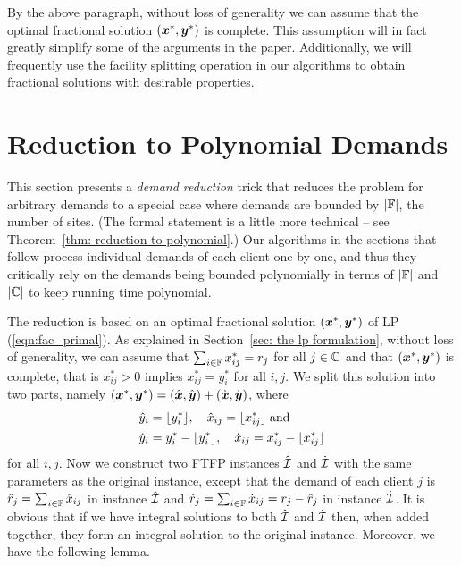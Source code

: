\documentclass[11pt]{article}
\begin{document}
By the above paragraph,  without loss of generality we can
assume that the optimal fractional solution $(\boldsymbol{x}^\ast, \boldsymbol{y}^\ast)$
is complete. This assumption will in fact greatly simplify some of
the arguments in the paper. Additionally, we will frequently use the facility
splitting operation in our algorithms to obtain fractional solutions with
desirable properties.



\section{Reduction to Polynomial Demands}
\label{sec: polynomial demands}

This section presents a \emph{demand reduction} trick that
reduces the problem for arbitrary demands to a special case
where demands are bounded by $|\mathbb{F}|$, the number of
sites.  (The formal statement is a little more technical --
see Theorem~\ref{thm: reduction to polynomial}.)  Our
algorithms in the sections that follow process individual
demands of each client one by one, and thus they critically
rely on the demands being bounded polynomially in terms of
$|\mathbb{F}|$ and $|\mathbb{C}|$ to keep running time
polynomial.

The reduction is based on an optimal fractional solution
$(\boldsymbol{x}^\ast,\boldsymbol{y}^\ast)$ of LP (\ref{eqn:fac_primal}). As explained in
Section~\ref{sec: the lp formulation}, without loss
of generality, we can assume that $\sum_{i\in\mathbb{F}} x^\ast_{ij} = r_j$ for all 
$j\in\mathbb{C}$ and that $(\boldsymbol{x}^\ast,\boldsymbol{y}^\ast)$ is complete, that is
$x^\ast_{ij} > 0$ implies $x^\ast_{ij} = y^\ast_i$ for all $i,j$. 
We split this solution into two parts, namely
$(\boldsymbol{x}^\ast,\boldsymbol{y}^\ast) = (\hat{\boldsymbol{x}},\hat{\boldsymbol{y}})+ (\dot{\boldsymbol{x}},\dot{\boldsymbol{y}})$, where
%
\begin{align*}
{\hat y}_i &= { \lfloor y_i^\ast \rfloor }, \quad
			{\hat x}_{ij} = { \lfloor x_{ij}^\ast \rfloor } \;\textrm{and}
			\\
{\dot y}_i &= y_i^\ast - { \lfloor y_i^\ast \rfloor }, \quad
 	{\dot x}_{ij} = x_{ij}^\ast -  { \lfloor x_{ij}^\ast \rfloor }
\end{align*}
%
for all $i,j$. Now we construct two
FTFP instances ${\hat{\cal I}}$ and ${\dot{\cal I}}$ with the same
parameters as the original instance, except that the demand of each client $j$ is
${\hat r}_j = \sum_{i\in\mathbb{F}} {\hat x}_{ij}$ in instance ${\hat{\cal I}}$ and
${\dot r}_j = \sum_{i\in\mathbb{F}} {\dot x}_{ij} = r_j - {\hat r}_j$ in instance ${\dot{\cal I}}$. 
It is obvious that if we have integral solutions to both ${\hat{\cal I}}$
and ${\dot{\cal I}}$ then, when added together, they form an integral
solution to the original instance.  Moreover, we have the
following lemma.
\end{document}
